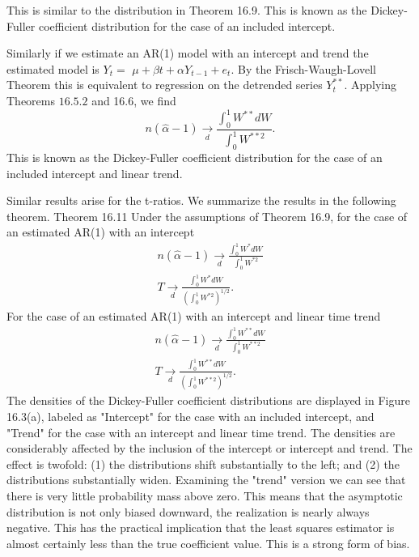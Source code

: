 \documentclass[10pt]{article}
\begin{document}
This is similar to the distribution in Theorem 16.9. This is known as the Dickey-Fuller coefficient distribution for the case of an included intercept.

Similarly if we estimate an AR(1) model with an intercept and trend the estimated model is $Y_{t}=$ $\mu+\beta t+\alpha Y_{t-1}+e_{t}$. By the Frisch-Waugh-Lovell Theorem this is equivalent to regression on the detrended series $Y_{t}^{* *}$. Applying Theorems $16.5 .2$ and 16.6, we find
$$
n(\widehat{\alpha}-1) \underset{d}{\longrightarrow} \frac{\int_{0}^{1} W^{* *} d W}{\int_{0}^{1} W^{* * 2}} .
$$
This is known as the Dickey-Fuller coefficient distribution for the case of an included intercept and linear trend.

Similar results arise for the t-ratios. We summarize the results in the following theorem. Theorem 16.11 Under the assumptions of Theorem 16.9, for the case of an estimated AR(1) with an intercept
$$
\begin{gathered}
n(\widehat{\alpha}-1) \underset{d}{\longrightarrow} \frac{\int_{0}^{1} W^{*} d W}{\int_{0}^{1} W^{* 2}} \\
T \underset{d}{\longrightarrow} \frac{\int_{0}^{1} W^{*} d W}{\left(\int_{0}^{1} W^{* 2}\right)^{1 / 2}} .
\end{gathered}
$$
For the case of an estimated AR(1) with an intercept and linear time trend
$$
\begin{gathered}
n(\widehat{\alpha}-1) \underset{d}{\longrightarrow} \frac{\int_{0}^{1} W^{* *} d W}{\int_{0}^{1} W^{* * 2}} \\
T \underset{d}{\longrightarrow} \frac{\int_{0}^{1} W^{* *} d W}{\left(\int_{0}^{1} W^{* * 2}\right)^{1 / 2}} .
\end{gathered}
$$
The densities of the Dickey-Fuller coefficient distributions are displayed in Figure 16.3(a), labeled as "Intercept" for the case with an included intercept, and "Trend" for the case with an intercept and linear time trend. The densities are considerably affected by the inclusion of the intercept or intercept and trend. The effect is twofold: (1) the distributions shift substantially to the left; and (2) the distributions substantially widen. Examining the "trend" version we can see that there is very little probability mass above zero. This means that the asymptotic distribution is not only biased downward, the realization is nearly always negative. This has the practical implication that the least squares estimator is almost certainly less than the true coefficient value. This is a strong form of bias.
\end{document}
